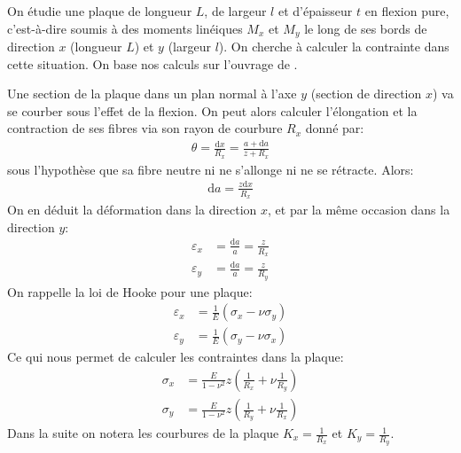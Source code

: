 \documentclass[11pt,titlepage]{article}
\begin{document}
On étudie une plaque de longueur $L$, de largeur $l$ et d'épaisseur $t$ en flexion pure, c'est-à-dire soumis à des moments linéiques $M_x$ et $M_y$ le long de ses bords de direction $x$ (longueur $L$) et $y$ (largeur $l$). On cherche à calculer la contrainte dans cette situation. On base nos calculs sur l'ouvrage de \Textcite{timo_plaque}.

Une section de la plaque dans un plan normal à l'axe $y$ (section de direction $x$) va se courber sous l'effet de la flexion. On peut alors calculer l'élongation et la contraction de ses fibres via son rayon de courbure $R_x$ donné par:
\begin{align}
    \theta = \frac{\mathrm{d}x}{R_x} = \frac{a+\mathrm{d}a}{z+R_x}
\end{align}
sous l'hypothèse que sa fibre neutre ni ne s'allonge ni ne se rétracte. Alors:
\begin{align}
    \mathrm{d}a = \frac{z\mathrm{d}x}{R_x}
\end{align}
On en déduit la déformation dans la direction $x$, et par la même occasion dans la direction $y$:
\begin{align}
    \varepsilon_x &= \frac{\mathrm{d}a}{a} = \frac{z}{R_x}\\
    \varepsilon_y &= \frac{\mathrm{d}a}{a} = \frac{z}{R_y}
\end{align}
On rappelle la loi de Hooke pour une plaque:
\begin{align}
    \varepsilon_x &= \frac{1}{E}\left ( \sigma_x - \nu \sigma_y \right )\\
    \varepsilon_y &= \frac{1}{E}\left ( \sigma_y - \nu \sigma_x \right )
\end{align}
Ce qui nous permet de calculer les contraintes dans la plaque:
\begin{align}
    \sigma_x &= \frac{E}{1-\nu^2}z\left (\frac{1}{R_x} + \nu \frac{1}{R_y}\right )\label{eq:cintragex}\\
    \sigma_y &= \frac{E}{1-\nu^2}z\left (\frac{1}{R_y} + \nu \frac{1}{R_x}\right ) \label{eq:cintragey}
\end{align}
Dans la suite on notera les courbures de la plaque $K_x = \frac{1}{R_x}$ et $K_y = \frac{1}{R_y}$. 
\end{document}
